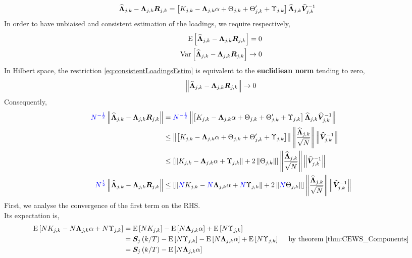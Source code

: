 \documentclass[main_document.tex]{subfiles}
\begin{document}
	\begin{align*}
		\widehat{\bm{\Lambda}}_{j,k} - \bm{\Lambda}_{j,k}\bm{R}_{j,k} &= \left[  K_{j,k} - \bm{\Lambda}_{j,k}\alpha + \Theta_{j,k} + \Theta_{j,k}' + \Upsilon_{j,k} \right] \widehat{\bm{\Lambda}}_{j,k} \widehat{\bm{V}}_{j,k}^{-1} 
	\end{align*}
In order to have unbiaised and consistent estimation of the loadings, we require respectively, 
	\begin{align}
		\mathrm{E}\left[\widehat{\bm{\Lambda}}_{j,k} - \bm{\Lambda}_{j,k}\bm{R}_{j,k}\right] = 0 \label{eq:unbiaisedLoadingsEstim} \\
		\mathrm{Var}\left[\widehat{\bm{\Lambda}}_{j,k} - \bm{\Lambda}_{j,k}\bm{R}_{j,k}\right] \to 0 \label{eq:consistentLoadingsEstim}
	\end{align}
In Hilbert space, the restriction \eqref{eq:consistentLoadingsEstim} is equivalent to the \textbf{euclidiean norm} tending to zero, 
	\begin{align}
		\left\lVert\widehat{\bm{\Lambda}}_{j,k} - \bm{\Lambda}_{j,k}\bm{R}_{j,k}\right\rVert \to 0
	\end{align}
Consequently, 
	\begin{align*}
		\textcolor{blue}{N^{-\frac{1}{2}}}\left\lVert\widehat{\bm{\Lambda}}_{j,k} - \bm{\Lambda}_{j,k}\bm{R}_{j,k}\right\rVert &= \textcolor{blue}{N^{-\frac{1}{2}}}\left\lVert\left[  K_{j,k} - \bm{\Lambda}_{j,k}\alpha + \Theta_{j,k} + \Theta_{j,k}' + \Upsilon_{j,k} \right] \widehat{\bm{\Lambda}}_{j,k} \widehat{\bm{V}}_{j,k}^{-1} \right\rVert \\
		& \leq \left\lVert\left[  K_{j,k} - \bm{\Lambda}_{j,k}\alpha + \Theta_{j,k} + \Theta_{j,k}' + \Upsilon_{j,k} \right]\right\rVert \left\lVert\frac{\widehat{\bm{\Lambda}}_{j,k}}{\sqrt{N}}\right\rVert \left\lVert\widehat{\bm{V}}_{j,k}^{-1}\right\rVert\\
		& \leq \left[ \left\lVert K_{j,k} - \bm{\Lambda}_{j,k}\alpha + \Upsilon_{j,k}\right\rVert + 2 \left\lVert\Theta_{j,k}\right\rVert\right] \left\lVert\frac{\widehat{\bm{\Lambda}}_{j,k}}{\sqrt{N}}\right\rVert \left\lVert\widehat{\bm{V}}_{j,k}^{-1}\right\rVert \\
		\textcolor{blue}{N^{\frac{1}{2}}}\left\lVert\widehat{\bm{\Lambda}}_{j,k} - \bm{\Lambda}_{j,k}\bm{R}_{j,k}\right\rVert & \leq \left[ \left\lVert\textcolor{blue}{N} K_{j,k} - \textcolor{blue}{N}\bm{\Lambda}_{j,k}\alpha + \textcolor{blue}{N}\Upsilon_{j,k}\right\rVert + 2 \left\lVert\textcolor{blue}{N}\Theta_{j,k}\right\rVert\right] \left\lVert\frac{\widehat{\bm{\Lambda}}_{j,k}}{\sqrt{N}}\right\rVert \left\lVert\widehat{\bm{V}}_{j,k}^{-1}\right\rVert
	\end{align*}
First, we analyse the convergence of the first term on the RHS. \\
Its expectation is, 
\begin{align*}
	\mathrm{E}\left[N K_{j,k} - N\bm{\Lambda}_{j,k}\alpha + N\Upsilon_{j,k}\right] &= \mathrm{E}\left[N K_{j,k}\right] - \mathrm{E}\left[N\bm{\Lambda}_{j,k}\alpha\right] + \mathrm{E}\left[N\Upsilon_{j,k}\right] \\
		&= \bm{S}_{j}\left(k/T\right) - \mathrm{E}\left[N\Upsilon_{j,k}\right] - \mathrm{E}\left[N\bm{\Lambda}_{j,k}\alpha\right] + \mathrm{E}\left[N\Upsilon_{j,k}\right] \quad \text{ by theorem } \eqref{thm:CEWS_Components} \\
	      &= \bm{S}_{j}\left(k/T\right) - \mathrm{E}\left[N\bm{\Lambda}_{j,k}\alpha\right]
\end{align*}
\end{document}
